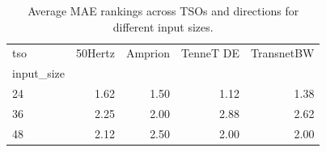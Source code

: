 \begin{table}
\caption{Average MAE rankings across TSOs and directions for different input sizes.}
\label{tab:input_size_mae_rankings}
\begin{tabular}{lrrrr}
\toprule
tso & 50Hertz & Amprion & TenneT DE & TransnetBW \\
input_size &  &  &  &  \\
\midrule
24 & 1.62 & 1.50 & 1.12 & 1.38 \\
36 & 2.25 & 2.00 & 2.88 & 2.62 \\
48 & 2.12 & 2.50 & 2.00 & 2.00 \\
\bottomrule
\end{tabular}
\end{table}
